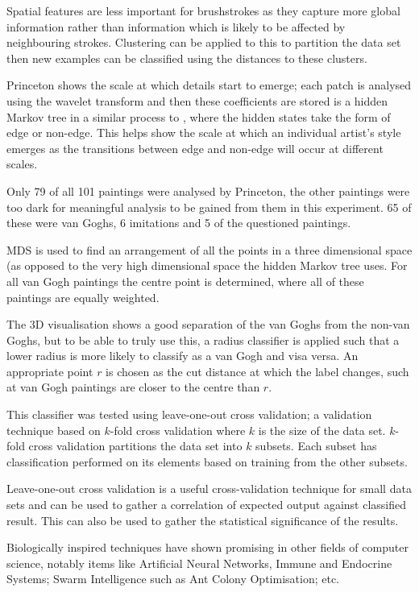 \documentclass[conference]{IEEEtran}
\begin{document}
Spatial features are less important for brushstrokes as they capture more
global information rather than information which is likely to be affected by
neighbouring strokes. Clustering can be applied to this to partition the data
set then new examples can be classified using the distances to these clusters.

Princeton shows the scale at which details start to emerge; each patch is
analysed using the wavelet transform and then these coefficients are stored is
a hidden Markov tree in a similar process to \cite{jafarpour2009stylistic},
where the hidden states take the form of edge or non-edge. This helps show the
scale at which an individual artist's style emerges as the transitions between
edge and non-edge will occur at different scales.

Only 79 of all 101 paintings were analysed by Princeton, the other paintings
were too dark for meaningful analysis to be gained from them in this
experiment. 65 of these were van Goghs, 6 imitations and 5 of the questioned
paintings.

\gls{MDS} is used to find an arrangement of all the points in a three
dimensional space (as opposed to the very high dimensional space the hidden
Markov tree uses. For all van Gogh paintings the centre point is determined,
where all of these paintings are equally weighted.

The 3D visualisation shows a good separation of the van Goghs from the non-van
Goghs, but to be able to truly use this, a radius classifier is applied such
that a lower radius is more likely to classify as a van Gogh and visa versa. An
appropriate point $r$ is chosen as the cut distance at which the label changes,
such at van Gogh paintings are closer to the centre than $r$.

This classifier was tested using leave-one-out cross validation; a validation
technique based on $k$-fold cross validation where $k$ is the size of the data
set. $k$-fold cross validation partitions the data set into $k$ subsets. Each
subset has classification performed on its elements based on training from the
other subsets.

Leave-one-out cross validation is a useful cross-validation technique for small
data sets and can be used to gather a correlation of expected output against
classified result. This can also be used to gather the statistical significance
of the results.

Biologically inspired techniques have shown promising in other fields of
computer science, notably items like Artificial Neural Networks, Immune and
Endocrine Systems; Swarm Intelligence such as Ant Colony Optimisation; etc.
\end{document}
